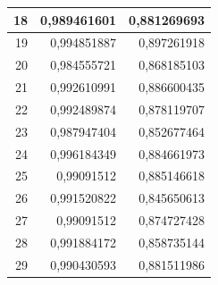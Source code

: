 \documentclass{beamer}
\begin{document}
\begin{frame}
\begin{table}[htbp]
{\begin{tabular}{|rrr|}
    \midrule
    \rowcolor[rgb]{ .886,  .937,  .855} 18    & 0,989461601 & 0,881269693 \\
    \midrule
    19    & 0,994851887 & 0,897261918 \\
    \midrule
    \rowcolor[rgb]{ .886,  .937,  .855} 20    & 0,984555721 & 0,868185103 \\
    \midrule
    21    & 0,992610991 & 0,886600435 \\
    \midrule
    \rowcolor[rgb]{ .886,  .937,  .855} 22    & 0,992489874 & 0,878119707 \\
    \midrule
    23    & 0,987947404 & 0,852677464 \\
    \midrule
    \rowcolor[rgb]{ .886,  .937,  .855} 24    & 0,996184349 & 0,884661973 \\
    \midrule
    25    & 0,99091512 & 0,885146618 \\
    \midrule
    \rowcolor[rgb]{ .886,  .937,  .855} 26    & 0,991520822 & 0,845650613 \\
    \midrule
    27    & 0,99091512 & 0,874727428 \\
    \midrule
    \rowcolor[rgb]{ .886,  .937,  .855} 28    & 0,991884172 & 0,858735144 \\
    \midrule
    29    & 0,990430593 & 0,881511986 \\
    \bottomrule
    \end{tabular}
  }
  \label{tab:addlabel}
\end{table}
\end{frame}
\end{document}
